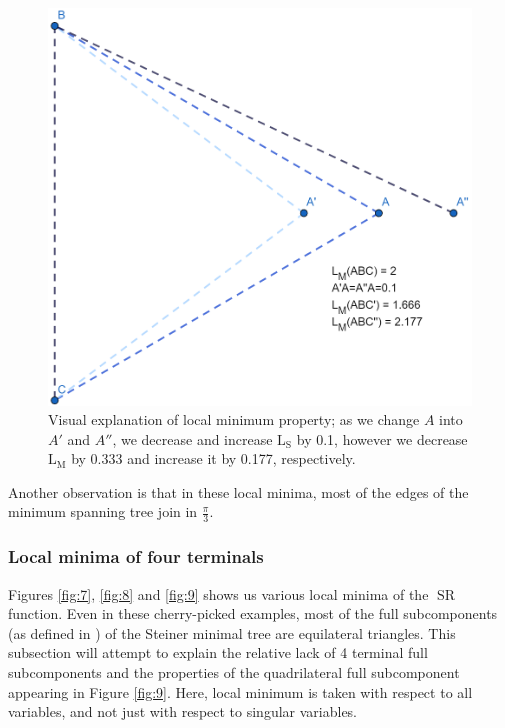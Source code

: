 \documentclass{mpaper}
\begin{document}
\begin{figure}[h!]
  \begin{center}
  \includegraphics[scale=1.3]{plot9.png}
  \end{center}
  \caption{\label{fig:10}Visual explanation of local minimum property; as we change $A$ into $A'$ and $A''$, we decrease and increase $\operatorname{L_S}$ by 0.1, however we decrease $\operatorname{L_M}$ by 0.333 and increase it by 0.177, respectively.}
\end{figure}

Another observation is that in these local minima, most of the edges of the minimum spanning tree join in $\frac{\pi}{3}$. 

\subsubsection{Local minima of four terminals}\label{sec:rhombus}
Figures \ref{fig:7}, \ref{fig:8} and \ref{fig:9} shows us various local minima of the $\operatorname{SR}$ function. Even in these cherry-picked examples, most of the full subcomponents (as defined in \cite{GP1968}) of the Steiner minimal tree are equilateral triangles. This subsection will attempt to explain the relative lack of 4 terminal full subcomponents and the properties of the  quadrilateral full subcomponent appearing in Figure \ref{fig:9}. Here, local minimum is taken with respect to all variables, and not just with respect to singular variables.
\end{document}
